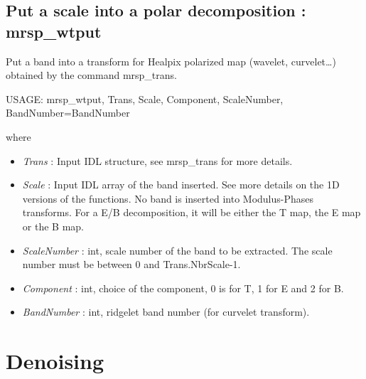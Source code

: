 \subsection{Put a scale into a polar decomposition : mrsp\_wtput}
Put a band into a transform for Healpix polarized map (wavelet, curvelet\ldots) obtained by the command mrsp\_trans.
{\bf
\begin{center}
     USAGE:   mrsp\_wtput, Trans, Scale, Component, ScaleNumber, BandNumber=BandNumber
\end{center}}
where
\begin{itemize}
\item {\em Trans} : Input IDL structure, see mrsp\_trans for more details.
\item {\em Scale} : Input IDL array of the band inserted. See more details on the 1D versions of the functions. 
No band is inserted into Modulus-Phases transforms. For a E/B decomposition, it will be either the T map, the E map or the B map.
\item {\em ScaleNumber} : int, scale number of the band to be extracted. The scale number must be between 0 and Trans.NbrScale-1.
\item {\em Component} : int, choice of the component, 0 is for T, 1 for E and 2 for B.
\item {\em BandNumber} : int, ridgelet band number (for curvelet transform).
\end{itemize}



\section{Denoising}
